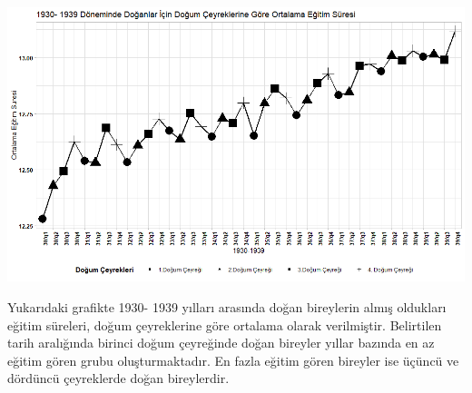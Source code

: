 \documentclass[12pt, a4paper, showtrims]{article}
\begin{document}
\begin{justify}
\begin{justify}
\begin{justify}
\begin{justify}
\begin{justify}
    \includegraphics[width=\textwidth]{Graph.png}

    Yukarıdaki grafikte 1930- 1939 yılları arasında doğan bireylerin almış oldukları eğitim süreleri,
    doğum çeyreklerine göre ortalama olarak verilmiştir. Belirtilen tarih aralığında birinci 
    doğum çeyreğinde doğan bireyler yıllar bazında en az eğitim gören grubu oluşturmaktadır.
    En fazla eğitim gören bireyler ise üçüncü ve dördüncü çeyreklerde doğan bireylerdir.


    \end{justify}

    \end{justify}    
    \end{justify}


\end{justify}   


    
     
\end{justify}




    
\end{document}
